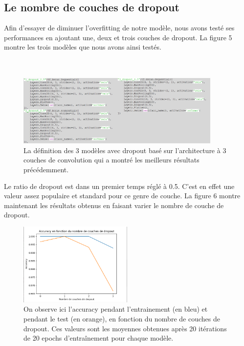 \documentclass{article}
\begin{document}
\subsection{Le nombre de couches de dropout}
Afin d'essayer de diminuer l'overfitting de notre modèle, nous avons testé ses performances en ajoutant une, deux et trois couches de dropout. La figure 5 montre les trois modèles que nous avons ainsi testés.\\\\\\
\begin{figure}[h]
\centering
\includegraphics[width=0.9\textwidth]{dropout_models.png}
\caption{\label{fig:Input}La définition des 3 modèles avec dropout basé sur l'architecture à 3 couches de convolution qui a montré les meilleurs résultats précédemment.\\}
\end{figure}

Le ratio de dropout est dans un premier temps réglé à 0.5. C'est en effet une valeur assez populaire et standard pour ce genre de couche. La figure 6 montre maintenant les résultats obtenus en faisant varier le nombre de couche de dropout.
\begin{figure}[h]
\centering
\includegraphics[width=0.5\textwidth]{dropout_var.png}
\caption{\label{fig:Input}On observe ici l'accuracy pendant l'entrainement (en bleu) et pendant le test (en orange), en fonction du nombre de couches de dropout. Ces valeurs sont les moyennes obtenues après 20 itérations de 20 epochs d'entraînement pour chaque modèle.}
\end{figure}
\end{document}
